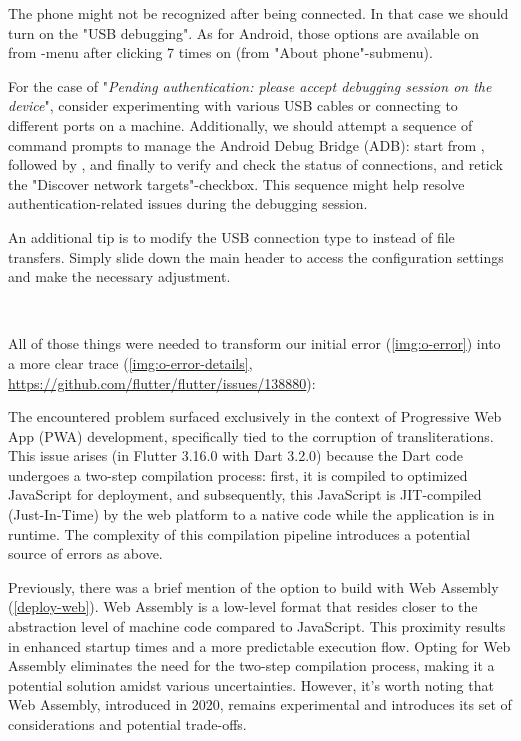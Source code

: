 
\noindent The phone might not be recognized after being connected. In that case we should turn on the "USB debugging".
As for Android, those options are available on  from -menu after clicking 7 times 
on  (from "About phone"-submenu).

For the case of "\emph{Pending authentication: please accept debugging session on the device}", consider experimenting 
with various USB cables or connecting to different ports on a machine. Additionally, we should attempt a sequence of 
command prompts to manage the Android Debug Bridge (ADB): start from , followed by 
, and finally  to verify and check the status of connections, and retick the 
"Discover network targets"-checkbox. This sequence might help resolve authentication-related issues during the debugging 
session.

An additional tip is to modify the USB connection type to  instead of file transfers. Simply slide down the 
main header to access the configuration settings and make the necessary adjustment.

~

\noindent All of those things were needed to transform our initial error (\cref{img:o-error}) into a more clear trace 
(\cref{img:o-error-details}, 
\href{https://github.com/flutter/flutter/issues/138880}{https://github.com/flutter/flutter/issues/138880}):


\noindent The encountered problem surfaced exclusively in the context of Progressive Web App (PWA) development, 
specifically tied to the corruption of transliterations. This issue arises (in Flutter 3.16.0 with Dart 3.2.0) because 
the Dart code undergoes a two-step compilation process: first, it is compiled to optimized JavaScript for deployment, 
and subsequently, this JavaScript is JIT-compiled (Just-In-Time) by the web platform to a native code while the 
application is in runtime. The complexity of this compilation pipeline introduces a potential source of errors as above.

Previously, there was a brief mention of the option to build with Web Assembly (\ref{deploy-web}). Web Assembly is a 
low-level format that resides closer to the abstraction level of machine code compared to JavaScript. This proximity 
results in enhanced startup times and a more predictable execution flow. Opting for Web Assembly eliminates the need 
for the two-step compilation process, making it a potential solution amidst various uncertainties. However, it's worth 
noting that Web Assembly, introduced in 2020, remains experimental and introduces its set of considerations and 
potential trade-offs.

